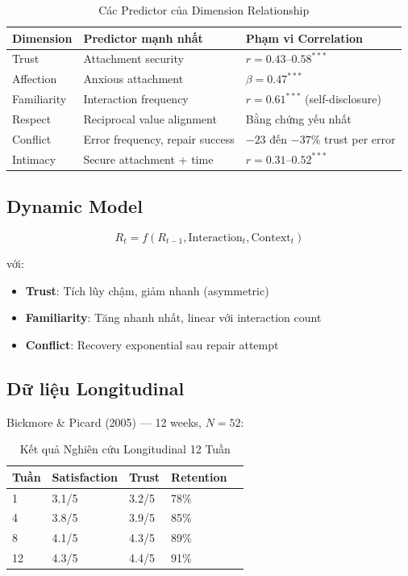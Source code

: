\documentclass[10pt,leqno]{amsart}
\begin{document}
\begin{table}[H]
\centering
\caption{Các Predictor của Dimension Relationship}
\label{tab:relationship-dims}
\begin{tabular}{lll}
\toprule
\textbf{Dimension} & \textbf{Predictor mạnh nhất} & \textbf{Phạm vi Correlation} \\
\midrule
Trust & Attachment security & $r=0.43$--$0.58^{***}$ \\
Affection & Anxious attachment & $\beta=0.47^{***}$ \\
Familiarity & Interaction frequency & $r=0.61^{***}$ (self-disclosure) \\
Respect & Reciprocal value alignment & Bằng chứng yếu nhất \\
Conflict & Error frequency, repair success & $-23$ đến $-37$\% trust per error \\
Intimacy & Secure attachment + time & $r=0.31$--$0.52^{***}$ \\
\bottomrule
\end{tabular}
\end{table}

\subsection{Dynamic Model}

\begin{equation}
R_t = f(R_{t-1}, \text{Interaction}_t, \text{Context}_t)
\end{equation}

với:
\begin{itemize}
    \item \textbf{Trust}: Tích lũy chậm, giảm nhanh (asymmetric)
    \item \textbf{Familiarity}: Tăng nhanh nhất, linear với interaction count
    \item \textbf{Conflict}: Recovery exponential sau repair attempt
\end{itemize}

\subsection{Dữ liệu Longitudinal}

Bickmore \& Picard (2005) --- 12 weeks, $N=52$:

\begin{table}[H]
\centering
\caption{Kết quả Nghiên cứu Longitudinal 12 Tuần}
\label{tab:longitudinal-rel}
\begin{tabular}{lllll}
\toprule
\textbf{Tuần} & \textbf{Satisfaction} & \textbf{Trust} & \textbf{Retention} \\
\midrule
1 & 3.1/5 & 3.2/5 & 78\% \\
4 & 3.8/5 & 3.9/5 & 85\% \\
8 & 4.1/5 & 4.3/5 & 89\% \\
12 & 4.3/5 & 4.4/5 & 91\% \\
\bottomrule
\end{tabular}
\end{table}
\end{document}
